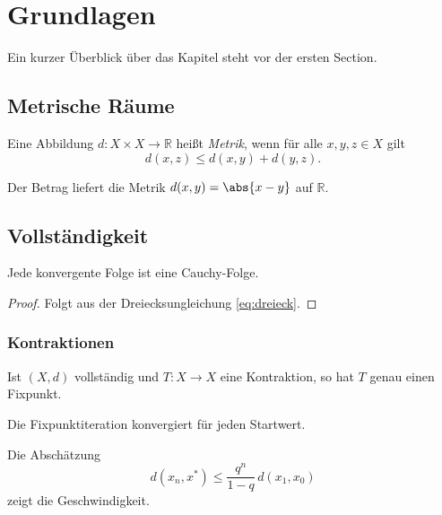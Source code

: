 \chapter{Grundlagen}
\label{chap:grundlagen}

Ein kurzer Überblick über das Kapitel steht vor der ersten Section.

\section{Metrische Räume}
\label{sec:metrisch}

\begin{definition}
\label{def:metrik}
Eine Abbildung $d\colon X\times X\to\mathbb{R}$ heißt \emph{Metrik}, wenn
für alle $x,y,z\in X$ gilt
\begin{equation}
\label{eq:dreieck}
  d(x,z)\le d(x,y)+d(y,z).
\end{equation}
\end{definition}

\begin{example}
Der Betrag liefert die Metrik $d(x,y)=\abs{x-y}$ auf $\mathbb{R}$.
\end{example}

\section{Vollständigkeit}
\label{sec:vollstaendig}

\begin{lemma}
\label{lem:cauchy}
Jede konvergente Folge ist eine Cauchy-Folge.
\end{lemma}

\begin{proof}
Folgt aus der Dreiecksungleichung \eqref{eq:dreieck}.
\end{proof}

\subsection{Kontraktionen}
\label{subsec:kontraktion}

\begin{theorem}[Banach]
\label{thm:banach}
Ist $(X,d)$ vollständig und $T\colon X\to X$ eine Kontraktion, so hat $T$
genau einen Fixpunkt.
\end{theorem}

\begin{corollary}
\label{cor:eindeutig}
Die Fixpunktiteration konvergiert für jeden Startwert.
\end{corollary}

Die Abschätzung
\begin{equation}
\label{eq:apriori}
  d(x_n,x^*)\le\frac{q^n}{1-q}\,d(x_1,x_0)
\end{equation}
zeigt die Geschwindigkeit.

